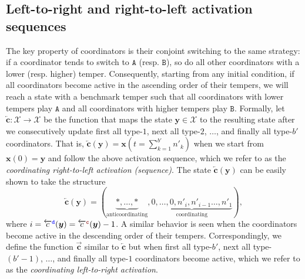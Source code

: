 \documentclass[10 pt,twocolumn,journal]{IEEEtran}
\theoremstyle{plain}
\newcommand{\A}{\mathcal{A}}
\newcommand{\X}{\mathcal{X}}
\newcommand{\x}{\bm{x}}
\newcommand{\y}{\bm{y}}
\renewcommand{\c}{\bm{c}}
\newcommand{\oo}{\tr{\mathtt{c}}}
\newcommand{\nn}{\tb{\mathtt{d}}}
\renewcommand{\A}{\mathtt{A}}
\newcommand{\B}{\mathtt{B}}
\newcommand{\tb}{\textcolor{blue}}
\newcommand{\tr}{\textcolor{Myred}}
\theoremstyle{definition}
\begin{document}
\subsection{Left-to-right and right-to-left activation sequences}   \label{sec_activationSequences}
The key property of coordinators is their conjoint switching to the same strategy: if a coordinator tends to switch to $\A$ (resp. $\B$), so do all other coordinators with a lower (resp. higher) temper.
Consequently, starting from any initial condition, if all coordinators become active in the ascending order of their tempers, we will reach a state with a benchmark temper such that all coordinators with lower tempers play $\A$ and all coordinators with higher tempers play $\B$.  
Formally, let $\overleftarrow{\c}: \X \to \X$ be the function that maps the state $\y\in\X$ to the resulting state after we consecutively update first all type-$1$, next all type-$2$, $\ldots$, and finally all type-$b'$ coordinators.
That is, $\overleftarrow{\c}(\y) = \x(t=\sum_{k = 1}^{b'}n'_k)$ when we start from $\x(0) = \y$ and follow the above activation sequence, which we refer to as the \emph{coordinating right-to-left activation (sequence)}.
The state $\overleftarrow{\c}(\y)$ can be easily shown to take the structure
\begin{equation*}
    \overleftarrow{\c}(\y) = 
    (\!\!\underbrace{*,\ldots,*}_{\text{anticoordinating}}\!\!, 
    \underbrace{0,\ldots,0, n'_i,n'_{i-1} \ldots, n'_1}_{\text{coordinating}}),
\end{equation*}
where $i = \overleftarrow{c}^{\nn}(\y) = \overleftarrow{c}^{\oo}(\y)-1$.
A similar behavior is seen when the coordinators become active in the descending order of their tempers. 
Correspondingly, we define the function $\overrightarrow{\c}$ similar to $\overleftarrow{\c}$ but when first all type-$b'$, next all type-$(b'-1)$, $\ldots$, and finally all type-$1$ coordinators become active, which we refer to as the  \emph{coordinating left-to-right activation}. 
\end{document}
